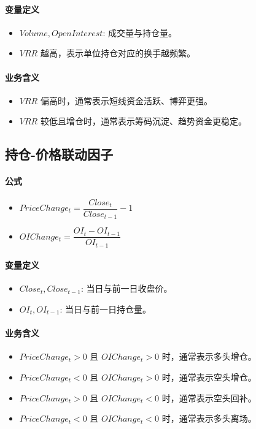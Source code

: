 \documentclass[11pt,a4paper]{ctexart}
\begin{document}
\paragraph{变量定义}
\begin{itemize}
\item $Volume, OpenInterest$: 成交量与持仓量。
\item $VRR$ 越高，表示单位持仓对应的换手越频繁。
\end{itemize}
\paragraph{业务含义}
\begin{itemize}
\item $VRR$ 偏高时，通常表示短线资金活跃、博弈更强。
\item $VRR$ 较低且增仓时，通常表示筹码沉淀、趋势资金更稳定。
\end{itemize}
\subsection{持仓-价格联动因子}
\paragraph{公式}
\begin{itemize}
\item $PriceChange_t=\dfrac{Close_t}{Close_{t-1}}-1$
\item $OIChange_t=\dfrac{OI_t-OI_{t-1}}{OI_{t-1}}$
\end{itemize}
\paragraph{变量定义}
\begin{itemize}
\item $Close_t, Close_{t-1}$: 当日与前一日收盘价。
\item $OI_t, OI_{t-1}$: 当日与前一日持仓量。
\end{itemize}
\paragraph{业务含义}
\begin{itemize}
\item $PriceChange_t>0$ 且 $OIChange_t>0$ 时，通常表示多头增仓。
\item $PriceChange_t<0$ 且 $OIChange_t>0$ 时，通常表示空头增仓。
\item $PriceChange_t>0$ 且 $OIChange_t<0$ 时，通常表示空头回补。
\item $PriceChange_t<0$ 且 $OIChange_t<0$ 时，通常表示多头离场。
\end{itemize}
\end{document}
